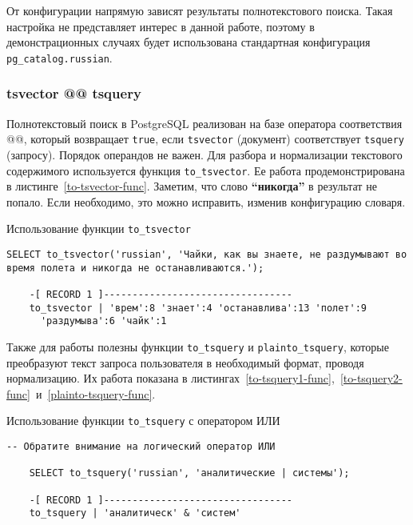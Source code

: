 От конфигурации напрямую зависят результаты полнотекстового поиска.
Такая настройка не представляет интерес в данной работе, поэтому в демонстрационных случаях будет использована стандартная конфигурация \texttt{pg\_catalog.russian}.

\subsubsection{tsvector @@ tsquery}

Полнотекстовый поиск в PostgreSQL реализован на базе оператора соответствия @@, который возвращает \texttt{true}, если \texttt{tsvector} (документ) соответствует \texttt{tsquery} (запросу).
Порядок операндов не важен.
Для разбора и нормализации текстового содержимого используется функция \texttt{to\_tsvector}. Ее работа продемонстрирована в листинге~\ref{to-tsvector-func}.
Заметим, что слово \textbf{\enquote{никогда}} в результат не попало. Если необходимо, это можно исправить, изменив конфигурацию словаря.

\begin{algorithm}
    \caption{Использование функции \texttt{to\_tsvector}}
    \label{to-tsvector-func}
    \begin{lstlisting}[style=codelistingstyle]
    SELECT to_tsvector('russian', 'Чайки, как вы знаете, не раздумывают во время полета и никогда не останавливаются.');

    -[ RECORD 1 ]---------------------------------
    to_tsvector | 'врем':8 'знает':4 'останавлива':13 'полет':9
      'раздумыва':6 'чайк':1
    \end{lstlisting}
\end{algorithm}

\noindent Также для работы полезны функции \texttt{to\_tsquery} и \texttt{plainto\_tsquery}, которые преобразуют текст запроса пользователя в необходимый формат, проводя нормализацию.
Их работа показана в листингах~\ref{to-tsquery1-func},~\ref{to-tsquery2-func}~и~\ref{plainto-tsquery-func}.

\begin{algorithm}
    \caption{Использование функции \texttt{to\_tsquery} с оператором ИЛИ}
    \label{to-tsquery1-func}
    \begin{lstlisting}[style=codelistingstyle]
    -- Обратите внимание на логический оператор ИЛИ

    SELECT to_tsquery('russian', 'аналитические | системы');

    -[ RECORD 1 ]---------------------------------
    to_tsquery | 'аналитическ' & 'систем'
    \end{lstlisting}
\end{algorithm}

